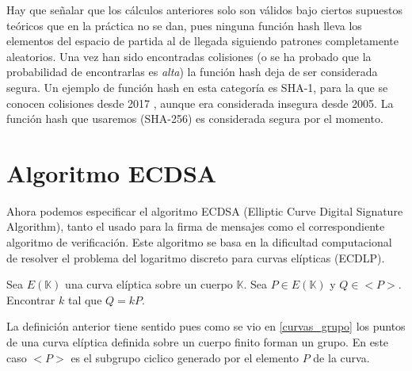 Hay que señalar que los cálculos anteriores solo son válidos bajo ciertos supuestos teóricos que en la práctica no se dan, pues ninguna función hash lleva los elementos del espacio de partida al de llegada siguiendo patrones completamente aleatorios. Una vez han sido encontradas colisiones (o se ha probado que la probabilidad de encontrarlas es \textit{alta}) la función hash deja de ser considerada segura. Un ejemplo de función hash en esta categoría es SHA-1, para la que se conocen colisiones desde 2017 \citep{sha-1}, aunque era considerada insegura desde 2005. 
La función hash que usaremos (SHA-256) es considerada segura por el momento.








\section{Algoritmo ECDSA}

Ahora podemos especificar el algoritmo ECDSA (Elliptic Curve Digital Signature Algorithm)\citet{elliptic_cripto}, tanto el usado para la firma de mensajes como el correspondiente algoritmo de verificación. Este algoritmo se basa en la dificultad computacional de resolver el problema del logaritmo discreto para curvas elípticas (ECDLP).

\theoremstyle{definition}\begin{definition}\label{ecdlp} Sea $E(\mathbb{K})$ una curva elíptica sobre un cuerpo $\mathbb{K}$. Sea $P \in E(\mathbb{K})$ y $Q \in <P>$. Encontrar $k$ tal que $Q= kP$. \end{definition}

La definición anterior tiene sentido pues como se vio en \ref{curvas_grupo} los puntos de una curva elíptica definida sobre un cuerpo finito forman un grupo. En este caso $<P>$ es el subgrupo ciclico generado por el elemento $P$ de la curva. 

